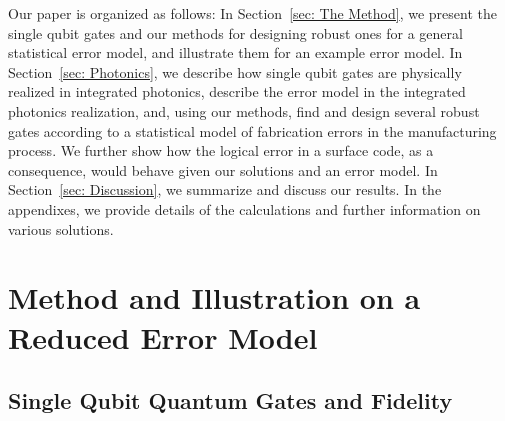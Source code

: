\documentclass[floatfix,reprint, amsmath,amssymb,aps,superscriptaddress,nofootinbib]{revtex4-2}
\begin{document}
Our paper is organized as follows: In Section~\ref{sec: The Method}, we present the single qubit gates and our methods for designing robust ones for a general statistical error model, and illustrate them for an example error model. In Section~\ref{sec: Photonics}, we describe how single qubit gates are physically realized in integrated photonics, describe the error model in the integrated photonics realization, and, using our methods, find and design several robust gates according to a statistical model of fabrication errors in the manufacturing process. We further show how the logical error in a surface code, as a consequence, would behave given our solutions and an error model. In Section~\ref{sec: Discussion}, we summarize and discuss our results. In the appendixes, we provide details of the calculations and further information on various solutions.


\section{Method and Illustration on a Reduced Error Model \label{sec: The Method}}

\subsection{Single Qubit Quantum Gates and Fidelity}
\end{document}
